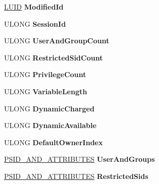\begin{DoxyCompactItemize}
\hyperlink{struct___l_u_i_d}{L\+U\+ID} {\bfseries Modified\+Id}
\item 
\mbox{\label{struct___t_o_k_e_n_a4cd90fd83de88602680bcffa1bd603ee}} 
U\+L\+O\+NG {\bfseries Session\+Id}
\item 
\mbox{\label{struct___t_o_k_e_n_ae0387af3b27556257c656e9f00f69e0b}} 
U\+L\+O\+NG {\bfseries User\+And\+Group\+Count}
\item 
\mbox{\label{struct___t_o_k_e_n_af55db32bf053023261f1db13d943ebea}} 
U\+L\+O\+NG {\bfseries Restricted\+Sid\+Count}
\item 
\mbox{\label{struct___t_o_k_e_n_a530ca62ab8b26a8498ac260ad21d9013}} 
U\+L\+O\+NG {\bfseries Privilege\+Count}
\item 
\mbox{\label{struct___t_o_k_e_n_a997b6da77308aec450fa03dbdc17c141}} 
U\+L\+O\+NG {\bfseries Variable\+Length}
\item 
\mbox{\label{struct___t_o_k_e_n_a0fd1d450dcbc3e546770d46e9e6ae9bb}} 
U\+L\+O\+NG {\bfseries Dynamic\+Charged}
\item 
\mbox{\label{struct___t_o_k_e_n_a91dec38b47dfa89f7d19a62af2af825e}} 
U\+L\+O\+NG {\bfseries Dynamic\+Available}
\item 
\mbox{\label{struct___t_o_k_e_n_a1d8bd9ff29a1449b5ead466d705bb7be}} 
U\+L\+O\+NG {\bfseries Default\+Owner\+Index}
\item 
\mbox{\label{struct___t_o_k_e_n_a62d85b0f1dad3f4ca46626ab7a252c75}} 
\hyperlink{struct___s_i_d___a_n_d___a_t_t_r_i_b_u_t_e_s}{P\+S\+I\+D\+\_\+\+A\+N\+D\+\_\+\+A\+T\+T\+R\+I\+B\+U\+T\+ES} {\bfseries User\+And\+Groups}
\item 
\mbox{\label{struct___t_o_k_e_n_a4ab5b88ed619a843a0b4ee4e0d69135c}} 
\hyperlink{struct___s_i_d___a_n_d___a_t_t_r_i_b_u_t_e_s}{P\+S\+I\+D\+\_\+\+A\+N\+D\+\_\+\+A\+T\+T\+R\+I\+B\+U\+T\+ES} {\bfseries Restricted\+Sids}
\item 
\mbox{\label{struct___t_o_k_e_n_ab0cbe54486ccf7e5a5a6c459c4f6c959}} 

\end{DoxyCompactItemize}
